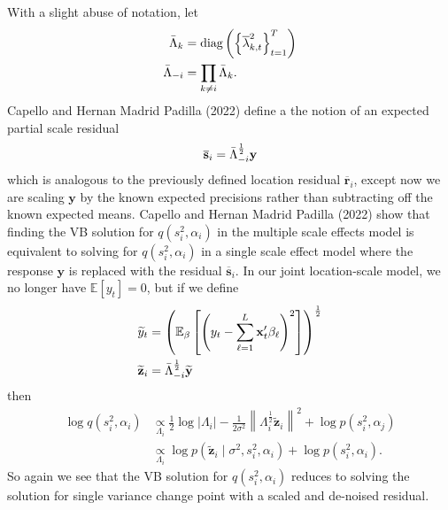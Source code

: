 \documentclass{article}
\newcommand{\E}{\mathbb{E}}
\begin{document}
\begin{itemize}
With a slight abuse of notation, let
\begin{align*}
    \bar{\Lambda}_k &= \text{diag}\left(\left\{\overline{\lambda}^2_{k,t}\right\}_{t=1}^T\right) \\
    \Bar{\Lambda}_{-i} &= \prod_{k \neq i} \bar{\Lambda}_k.
\end{align*}
Capello and Hernan Madrid Padilla (2022) define a the notion of an expected partial scale residual 
\begin{align*}
    \overline{\mathbf{s}}_i = \Bar{\Lambda}^{\frac{1}{2}}_{-i} \mathbf{y}
\end{align*}
which is analogous to the previously defined location residual $\overline{\mathbf{r}}_i$, except now we are scaling $\mathbf{y}$ by the known expected precisions rather than subtracting off the known expected means. Capello and Hernan Madrid Padilla (2022) show that finding the VB solution for $q(s_i^2,\alpha_i)$ in the multiple scale effects model is equivalent to solving for $q(s_i^2,\alpha_i)$ in a single scale effect model where the response $\mathbf{y}$ is replaced with the residual $\overline{\mathbf{s}}_i$. In our joint location-scale model, we no longer have $\E[y_t] = 0$, but if we define 
\begin{align*}
    \widetilde{y}_t &= \left(\E_\beta\left[\left(y_t - \sum_{\ell=1}^L \mathbf{x}'_t\beta_\ell\right)^2\right]\right)^{\frac{1}{2}} \\
    \widetilde{\mathbf{z}}_i &= \Bar{\Lambda}^{\frac{1}{2}}_{-i} \widetilde{\mathbf{y}}
\end{align*}
then 
\begin{align*}
    \log q(s_i^2,\alpha_i) &\underset{\Lambda_i}{\propto} \frac{1}{2} \log |\Lambda_i|
    - \frac{1}{2\sigma^2}\left\lVert\Lambda_i^{\frac{1}{2}}\widetilde{\mathbf{z}}_i\right\rVert^2  + \log p(s_i^2,\alpha_j)\\
    &\underset{\Lambda_i}{\propto} \log p\left(\widetilde{\mathbf{z}}_i \;|\; \sigma^2, s^2_i,\alpha_i\right) + \log p(s_i^2,\alpha_i).
\end{align*}
So again we see that the VB solution for $q(s_i^2,\alpha_i)$ reduces to solving the solution for single variance change point with a scaled and de-noised residual. 


\end{itemize}
\end{document}
